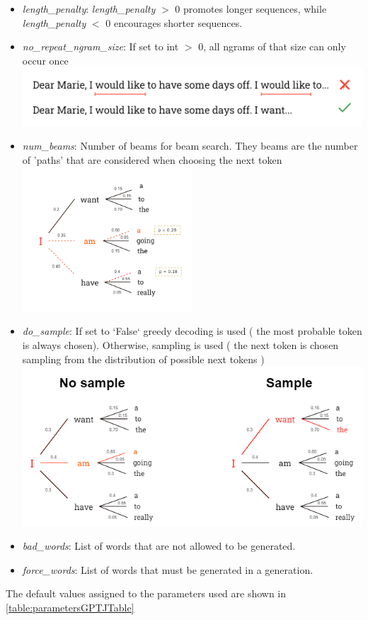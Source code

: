 \documentclass{article}
\begin{document}
\begin{itemize}
    \item \textit{length\_penalty}: \textit{length\_penalty} $>$ 0 promotes longer sequences, while \linebreak 
    \textit{length\_penalty} $<$ 0 encourages shorter sequences.
    \item \textit{no\_repeat\_ngram\_size}: If set to int $>$ 0, all ngrams of that size can only occur once \\
    \includegraphics[width=\textwidth]{no_ngram_thesis.drawio.png}
    \item \textit{num\_beams}: Number of beams for beam search. They beams are the number of 'paths' that are considered when choosing the next token \\
    \includegraphics[width=0.5\textwidth]{num_beams.drawio.png}
    \item \textit{do\_sample}: If set to `False` greedy decoding is used ( the most probable token is always chosen). Otherwise, sampling is used ( the next token is chosen sampling from the distribution of possible next tokens )
    \includegraphics[width=\textwidth]{do_sample.drawio.png}
    \item \textit{bad\_words}: List of words that are not allowed to be generated.
    \item \textit{force\_words}: List of words that must be generated in a generation.
    
\end{itemize}
The default values assigned to the parameters used are shown in \autoref{table:parametersGPTJTable}
\end{document}
